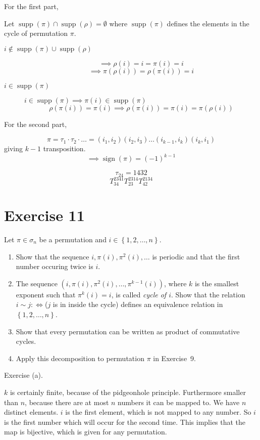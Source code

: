 \documentclass[a4paper]{article}
\theoremstyle{definition}
\DeclareMathOperator\sign{sign}
\newcommand\set[1]{\left\{#1\right\}}
\begin{document}
For the first part,

Let $\operatorname{supp}(\pi) \cap \operatorname{supp}(\rho) = \emptyset$ where $\operatorname{supp}(\pi)$ defines the elements in the cycle of permutation $\pi$.
\begin{description}
  \item[$i \not\in \operatorname{supp}(\pi) \cup \operatorname{supp}(\rho)$] 
    \[ \implies \rho(i) = i = \pi(i) = i \]
    \[ \implies \pi(\rho(i)) = \rho(\pi(i)) = i \]
  \item[$i \in \operatorname{supp}(\pi)$]
    $i \in \operatorname{supp}(\pi) \implies \pi(i) \in \operatorname{supp}(\pi)$
    \[ \rho(\pi(i)) = \pi(i) \implies \rho(\pi(i)) = \pi(i) = \pi(\rho(i)) \]
\end{description}

For the second part,

\[ \pi = \tau_1 \cdot \tau_2 \cdot \dots = (i_1, i_2) (i_2, i_3) \dots (i_{k-1}, i_k) (i_k, i_1) \]
giving $k-1$ transposition.
\[ \implies \sign(\pi) = (-1)^{k-1} \]

\[ \tau_{24} = 1432 \]
\[ T_{34}^{2341} T_{23}^{2314} T_{42}^{2134} \]

\section*{Exercise 11}
\begin{ex}
  Let $\pi \in \sigma_n$ be a permutation and $i \in \set{1, 2, \dots, n}$.
  \begin{enumerate}
    \item Show that the sequence $i, \pi(i), \pi^2(i), \dots$ is periodic and that the first number occuring twice is $i$.
    \item The sequence $(i, \pi(i), \pi^2(i), \dots, \pi^{k-1}(i))$, where $k$ is the smallest exponent such that $\pi^k(i) = i$, is called \emph{cycle of $i$}. Show that the relation $i \sim j : \iff $($j$ is in inside the cycle) defines an equivalence relation in $\set{1,2,\dots,n}$.
    \item Show that every permutation can be written as product of commutative cycles.
    \item Apply this decomposition to permutation $\pi$ in Exercise~9.
  \end{enumerate}
\end{ex}

Exercise (a).

$k$ is certainly finite, because of the pidgeonhole principle. Furthermore smaller than $n$, because there are at most $n$ numbers it can be mapped to. We have $n$ distinct elements. $i$ is the first element, which is not mapped to any number. So $i$ is the first number which will occur for the second time. This implies that the map is bijective, which is given for any permutation.
\end{document}
